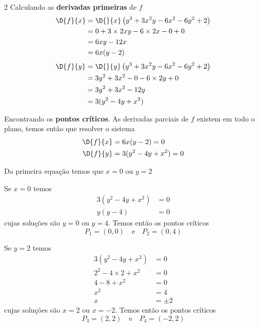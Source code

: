 \documentclass[a4paper,12pt,fleqn]{article}
\begin{document}
\begin{answer}
\setlength\columnsep{3em}
\begin{multicols*}{2}
\raggedcolumns
  Calculando as \textbf{derivadas primeiras} de $f$
  \begin{align*}
    \D{f}{x}
    & = \D{}{x}\left(y^3 + 3x^2y - 6x^2 - 6y^2 + 2\right) \\
    & = 0 + 3\times 2xy - 6\times 2x - 0 + 0 \\
    & = 6xy - 12x \\
    & = 6x(y - 2)
  \end{align*}
  \begin{align*}
    \D{f}{y}
    & = \D{}{y}\left(y^3 + 3x^2y - 6x^2 - 6y^2 + 2\right) \\
    & = 3y^2 + 3x^2 - 0 - 6\times 2y + 0 \\
    & = 3y^2 + 3x^2 - 12y \\
    & = 3(y^2 - 4y + x^2)
  \end{align*}

  Encontrando os \textbf{pontos críticos}.
  As derivadas parciais de $f$ existem em todo o plano, temos então que resolver o sistema
  \begin{align*}
    \D{f}{x} & = 6x(y - 2) = 0 \\
    \D{f}{y} & = 3(y^2 - 4y + x^2) = 0
  \end{align*}

  Da primeira equação temos que $x=0$ ou $y=2$

  Se $x=0$ temos
  \begin{align*}
    3(y^2 - 4y + x^2) & = 0 \\
    y(y - 4)          & = 0
  \end{align*}
  cujas soluções são $y=0$ ou $y=4$. Temos então os pontos críticos
  \[
    P_1 = (0, 0)
    \quad\text{e}\quad
    P_2 = (0, 4)
  \]

  Se $y=2$ temos
  \begin{align*}
    3(y^2 - 4y + x^2)     & = 0     \\
    2^2 - 4\times 2 + x^2 & = 0     \\
    4 - 8 + x^2           & = 0     \\
    x^2                   & = 4     \\
    x                     & = \pm 2
  \end{align*}
  cujas soluções são $x=2$ ou $x=-2$. Temos então os pontos críticos
  \[
    P_3 = (2, 2)
    \quad\text{e}\quad
    P_4 = (-2, 2)
  \]


\end{multicols*}
\end{answer}
\end{document}
